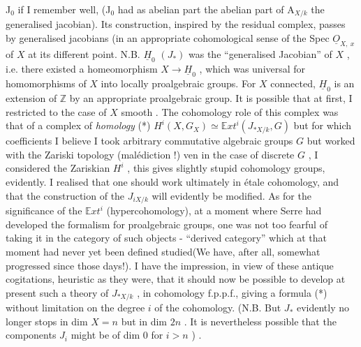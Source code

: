 
J$_0$ if I remember well, (J$_0$ had as abelian part the abelian part of A$_{X/k}$\hand{)}
the \allowbreak{} generalised jacobian). Its construction, inspired by the
residual complex, passes by generalised jacobians (in an appropriate cohomological
sense\hand{)} of the  Spec $\underline{O}_{X,\ x}$ of $X$ at its different point.
N.B. $\underline{H}_0$ $(J_*)$ was the ``generalised Jacobian'' of $X$ , i.e. there existed a
homeomorphism $X \to \underline{H}_0$ , which was universal for homomorphisms of $X$ into 
locally proalgebraic groups. For $X$ connected, $\underline{H}_0$ is an extension of $\mathbb{Z}$
by an appropriate proalgebraic group.
It is possible that\hand{,} at first, I restricted to the case of $X$ smooth .
The cohomology role of this complex was that of a complex of \textit{homology}
(*) $H^i(X, G_X) \simeq \mathbb{E}xt^i(J_{*X/k}, G)$ but for which coefficients I believe
I took arbitrary commutative algebraic groups $G$ but worked with the
Zariski topology (malédiction !) ven in the case of discrete $G$ , I considered
the Zariskian $H^i$ , this gives slightly stupid cohomology groups, evidently.
I realised that one should work ultimately in étale cohomology, and that
the construction of the \hand{(}$J$\hand{)}$_{iX/k}$ will evidently be modified. As for the
significance of the $\mathbb{E}xt^i$ (hypercohomology), at a moment where Serre had
developed the formalism for proalgebraic groups, one was not too fearful of
taking it in the category of such objects -  ``derived category''
which at that moment had never yet been  defined  studied(We have, after
all, somewhat progressed since those days!). I have the impression, in
view of these antique cogitations, heuristic as they were, that it should
now be possible to develop at present such a theory of $J_{*X/k}$ , in cohomology
f.p.p.f., giving a formula (*) without limitation on the degree $i$ of the
cohomology. (N.B. But $J_*$ evidently no longer stops in dim $X = n$ but
in dim $2n$ . It is nevertheless possible that the components $J_i$ might be
of dim 0 for $i > n$ ) .

